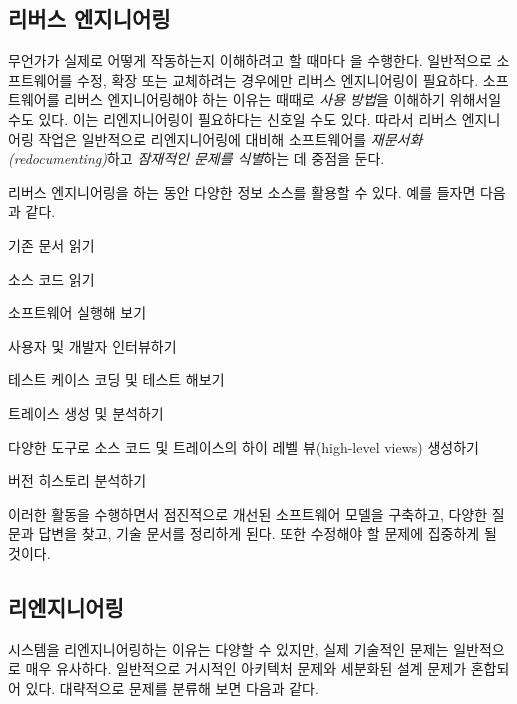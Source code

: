 \documentclass[a4paper,10pt,twoside]{book}
\begin{document}
\subsection*{리버스 엔지니어링}

무언가가 실제로 어떻게 작동하는지 이해하려고 할 때마다 을 수행한다. 일반적으로 소프트웨어를 수정, 확장 또는 교체하려는 경우에만 리버스 엔지니어링이 필요하다. 소프트웨어를 리버스 엔지니어링해야 하는 이유는 때때로 \emph{사용 방법}을 이해하기 위해서일 수도 있다. 이는 리엔지니어링이 필요하다는 신호일 수도 있다. 따라서 리버스 엔지니어링 작업은 일반적으로 리엔지니어링에 대비해 소프트웨어를 \emph{재문서화(redocumenting)}하고 \emph{잠재적인 문제를 식별}하는 데 중점을 둔다.

리버스 엔지니어링을 하는 동안 다양한 정보 소스를 활용할 수 있다. 예를 들자면 다음과 같다.

\begin{bulletlist}

  \item 기존 문서 읽기

  \item 소스 코드 읽기

  \item 소프트웨어 실행해 보기

  \item 사용자 및 개발자 인터뷰하기

  \item 테스트 케이스 코딩 및 테스트 해보기

  \item 트레이스 생성 및 분석하기

  \item 다양한 도구로 소스 코드 및 트레이스의 하이 레벨 뷰(high-level views) 생성하기

  \item 버전 히스토리 분석하기
\end{bulletlist}

이러한 활동을 수행하면서 점진적으로 개선된 소프트웨어 모델을 구축하고, 다양한 질문과 답변을 찾고, 기술 문서를 정리하게 된다. 또한 수정해야 할 문제에 집중하게 될 것이다.

\subsection*{리엔지니어링}

시스템을 리엔지니어링하는 이유는 다양할 수 있지만, 실제 기술적인 문제는 일반적으로 매우 유사하다. 일반적으로 거시적인 아키텍처 문제와 세분화된 설계 문제가 혼합되어 있다. 대략적으로 문제를 분류해 보면 다음과 같다.
\end{document}
